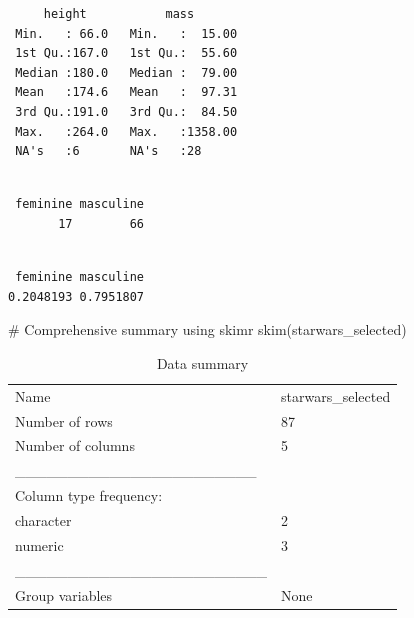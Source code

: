 \documentclass[
  man,
  floatsintext,
  longtable,
  nolmodern,
  notxfonts,
  notimes,
  colorlinks=true,linkcolor=blue,citecolor=blue,urlcolor=blue]{apa7}
\newenvironment{Shaded}{\begin{snugshade}}{\end{snugshade}}
\newcommand{\CommentTok}[1]{\textcolor[rgb]{0.37,0.37,0.37}{#1}}
\newcommand{\FunctionTok}[1]{\textcolor[rgb]{0.28,0.35,0.67}{#1}}
\newcommand{\NormalTok}[1]{\textcolor[rgb]{0.00,0.23,0.31}{#1}}
\newcommand{\SpecialCharTok}[1]{\textcolor[rgb]{0.37,0.37,0.37}{#1}}
\begin{document}
\begin{verbatim}
     height           mass        
 Min.   : 66.0   Min.   :  15.00  
 1st Qu.:167.0   1st Qu.:  55.60  
 Median :180.0   Median :  79.00  
 Mean   :174.6   Mean   :  97.31  
 3rd Qu.:191.0   3rd Qu.:  84.50  
 Max.   :264.0   Max.   :1358.00  
 NA's   :6       NA's   :28       
\end{verbatim}

\begin{Shaded}
\end{Shaded}

\begin{verbatim}

 feminine masculine 
       17        66 
\end{verbatim}

\begin{Shaded}
\end{Shaded}

\begin{verbatim}

 feminine masculine 
0.2048193 0.7951807 
\end{verbatim}

\begin{Shaded}
\begin{Highlighting}[]
\CommentTok{\# Comprehensive summary using skimr}
\FunctionTok{skim}\NormalTok{(starwars\_selected)}
\end{Highlighting}
\end{Shaded}

\begin{longtable}[]{@{}ll@{}}
\caption{Data summary}\tabularnewline
\toprule\noalign{}
\endfirsthead
\endhead
\bottomrule\noalign{}
\endlastfoot
Name & starwars\_selected \\
Number of rows & 87 \\
Number of columns & 5 \\
\_\_\_\_\_\_\_\_\_\_\_\_\_\_\_\_\_\_\_\_\_\_\_ & \\
Column type frequency: & \\
character & 2 \\
numeric & 3 \\
\_\_\_\_\_\_\_\_\_\_\_\_\_\_\_\_\_\_\_\_\_\_\_\_ & \\
Group variables & None \\
\end{longtable}
\end{document}
